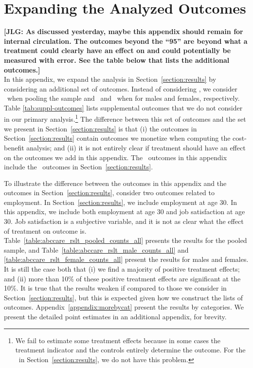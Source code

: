 \section{{Expanding the Analyzed Outcomes}} \label{appendix:moreoutcomes}

\noindent \textbf{[JLG: As discussed yesterday, maybe this appendix should remain for internal circulation. The outcomes beyond the ``95'' are beyond what a treatment could clearly have an effect on and could potentially be measured with error. See the table below that lists the additional outcomes.]} \\

\noindent In this appendix, we expand the analysis in Section~\ref{section:results} by considering an additional set of outcomes. Instead of considering \noutcomes, we consider \noutcomesexpp\ when pooling the sample and \noutcomesexpm\ and \noutcomesexpf\ when for males and females, respectively. Table \ref{tab:suppl-outcomes} lists supplemental outcomes that we do not consider in our primary analysis.\footnote{We fail to estimate some treatment effects because in some cases the treatment indicator and the controls entirely determine the outcome. For the \noutcomes\ in Section~\ref{section:results}, we do not have this problem.} The difference between this set of outcomes and the set we present in Section~\ref{section:results} is that (i) the outcomes in Section~\ref{section:results} contain outcomes we monetize when computing the cost-benefit analysis; and (ii) it is not entirely clear if treatment should have an effect on the outcomes we add in this appendix. The \noutcomesexpp\ outcomes in this appendix include the \noutcomes\ outcomes in Section~\ref{section:results}.\\

\singlespacing

\doublespacing

\noindent To illustrate the difference between the outcomes in this appendix and the outcomes in Section~\ref{section:results}, consider two outcomes related to employment. In Section~\ref{section:results}, we include employment at age 30. In this appendix, we include both employment at age 30 and job satisfaction at age 30. Job satisfaction is a subjective variable, and it is not as clear what the effect of treatment on outcome is.\\

\noindent Table~\ref{table:abccare_rslt_pooled_counts_all} presents the results for the pooled sample, and Table~\ref{table:abccare_rslt_male_counts_all} and \ref{table:abccare_rslt_female_counts_all} present the results for males and females. It is still the case both that (i) we find a majority of positive treatment effects; and (ii) more than 10\% of these positive treatment effects are significant at the 10\%. It is true that the results weaken if compared to those we consider in Section~\ref{section:results}, but this is expected given how we construct the lists of outcomes. Appendix~\ref{appendix:morebycat} present the results by categories. We present the detailed point estimates in an additional appendix, for brevity.

